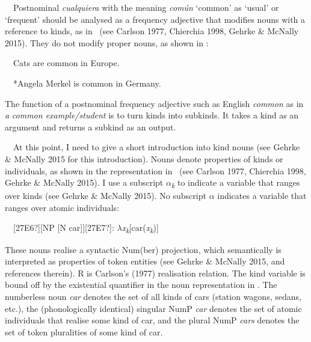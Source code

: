 \begin{styleStandard}
\ \ Postnominal \textit{cualquiera} with the meaning \textit{común} ‘common’ as ‘usual’ or ‘frequent’ should be analysed as a frequency adjective that modifies nouns with a reference to kinds, as in \ (see Carlson 1977, Chierchia 1998, Gehrke \& McNally 2015). They do not modify proper nouns, as shown in :
\end{styleStandard}

\begin{styleStandard}
\label{bkm:Ref72354905}\ \ Cats are common in Europe.
\end{styleStandard}

\begin{styleStandard}
\label{bkm:Ref72354921}\ \ *Angela Merkel is common in Germany.
\end{styleStandard}

\begin{styleStandard}
The function of a postnominal frequency adjective such as English \textit{common} as in \textit{a} \textit{common example/student} is to turn kinds into subkinds. It takes a kind as an argument and returns a subkind as an output. 
\end{styleStandard}

\begin{styleStandard}
\ \ At this point, I need to give a short introduction into kind nouns (see Gehrke \& McNally 2015 for this introduction). Nouns denote properties of kinds or individuals, as shown in the representation in \ (see Carlson 1977, Chierchia 1998, Gehrke \& McNally 2015). I use a subscript $\alpha $\textit{\textsubscript{k}} to indicate a variable that ranges over kinds (see Gehrke \& McNally 2015). No subscript $\alpha $ indicates a variable that ranges over atomic individuals:
\end{styleStandard}

\begin{styleStandard}
\label{bkm:Ref42889594}\ \ [27E6?][NP [N car]][27E7?]: $\lambda $\textit{x}\textit{\textsubscript{k}}[car(\textit{x}\textit{\textsubscript{k}})] 
\end{styleStandard}

\begin{styleStandard}
These nouns realise a syntactic Num(ber) projection, which semantically is interpreted as properties of token entities (see Gehrke \& McNally 2015, and references therein). R is Carlson’s (1977) realisation relation. The kind variable is bound off by the existential quantifier in the noun representation in . The numberless noun \textit{car }denotes the set of all kinds of cars (station wagons, sedans, etc.), the (phonologically identical) singular NumP \textit{car }denotes the set of atomic individuals that realise some kind of car, and the plural NumP \textit{cars }denotes the set of token pluralities of some kind of car.
\end{styleStandard}

